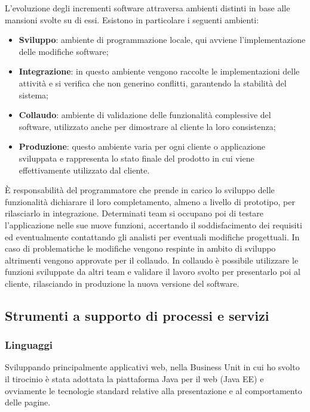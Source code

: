 	L'evoluzione degli incrementi software attraversa ambienti distinti in base alle mansioni svolte su di essi. Esistono in particolare i seguenti ambienti:
	\begin{itemize}
		\item \textbf{Sviluppo}: ambiente di programmazione locale, qui avviene l'implementazione delle modifiche software;
		\item \textbf{Integrazione}: in questo ambiente vengono raccolte le implementazioni delle attività e si verifica che non generino conflitti, garantendo la stabilità del sistema;
		\item \textbf{Collaudo}: ambiente di validazione delle funzionalità complessive del software, utilizzato anche per dimostrare al cliente la loro consistenza;
		\item \textbf{Produzione}: questo ambiente varia per ogni cliente o applicazione sviluppata e rappresenta lo stato finale del prodotto in cui viene effettivamente utilizzato dal cliente.
	\end{itemize}	
	
	È responsabilità del programmatore che prende in carico lo sviluppo delle funzionalità dichiarare il loro completamento, almeno a livello di prototipo, per rilasciarlo in integrazione. Determinati team si occupano poi di testare l'applicazione nelle sue nuove funzioni, accertando il soddisfacimento dei requisiti ed eventualmente contattando gli analisti per eventuali modifiche progettuali. In caso di problematiche le modifiche vengono respinte in ambito di sviluppo altrimenti vengono approvate per il collaudo. In collaudo è possibile utilizzare le funzioni sviluppate da altri team e validare il lavoro svolto per presentarlo poi al cliente, rilasciando in produzione la nuova versione del software.
	
	\subsection{Strumenti a supporto di processi e servizi}
	
	\subsubsection{Linguaggi}
	Sviluppando principalmente applicativi web, nella Business Unit in cui ho svolto il tirocinio è stata adottata la piattaforma Java per il web (Java EE) e ovviamente le tecnologie standard relative alla presentazione e al comportamento delle pagine.\\
	

